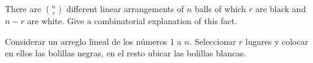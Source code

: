 \item There are $\displaystyle \binom{n}{r}$ different linear arrangements of $n$ balls of which $r$ are black and $n - r$ are white. Give a combinatorial explanation of this fact.

Considerar un arreglo lineal de los números 1 a $n$. Seleccionar $r$ lugares y colocar en ellos las bolillas negras, en el resto ubicar las bolillas blancas.